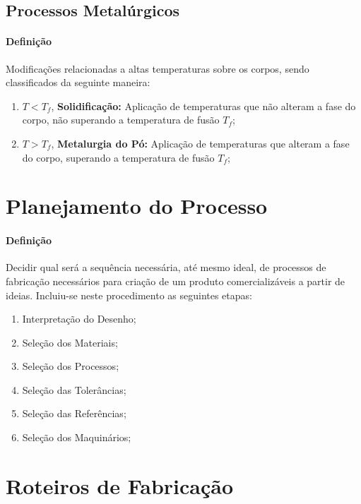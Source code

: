 \documentclass{article}
\begin{document}
        \subsection{Processos Metalúrgicos}
            \paragraph{Definição}Modificações relacionadas a altas temperaturas sobre os corpos, sendo classificados da seguinte maneira:
                \begin{enumerate}[rightmargin = \leftmargin]
                    \item $T < T_{f}$, \textbf{Solidificação:} Aplicação de temperaturas que não alteram a fase do corpo, não superando a temperatura de fusão $T_{f}$;

                    \item $T > T_{f}$, \textbf{Metalurgia do Pó:} Aplicação de temperaturas que alteram a fase do corpo, superando a temperatura de fusão $T_{f}$;
                \end{enumerate}
\newpage

    \section{Planejamento do Processo}
        \paragraph{Definição}Decidir qual será a sequência necessária, até mesmo ideal, de processos de fabricação necessários para criação de um produto comercializáveis a partir de ideias. Incluiu-se neste procedimento as seguintes etapas:
            \begin{enumerate}[rightmargin = \leftmargin, noitemsep]
                \item Interpretação do Desenho;
                \item Seleção dos Materiais;
                \item Seleção dos Processos;
                \item Seleção das Tolerâncias;
                \item Seleção das Referências;
                \item Seleção dos Maquinários;
            \end{enumerate}
\newpage

    \section{Roteiros de Fabricação}
\end{document}
